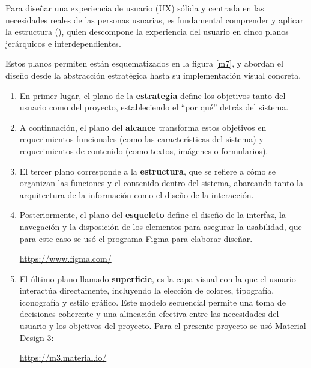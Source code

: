 Para diseñar una experiencia de usuario (UX) sólida y centrada en las necesidades reales de las personas usuarias, es fundamental comprender y aplicar la estructura (\cite{garrett2011elements}), quien descompone la experiencia del usuario en cinco planos jerárquicos e interdependientes. 

Estos planos permiten están esquematizados en la figura \ref{m7}, y abordan el diseño desde la abstracción estratégica hasta su implementación visual concreta. 

\begin{enumerate}
  \item En primer lugar, el plano de la \textbf{estrategia} define los objetivos tanto del usuario como del proyecto, estableciendo el ``por qué'' detrás del sistema. 
  
   \item A continuación, el plano del \textbf{alcance} transforma estos objetivos en requerimientos funcionales (como las características del sistema) y requerimientos de contenido (como textos, imágenes o formularios).

 \item El tercer plano corresponde a la \textbf{estructura}, que se refiere a cómo se organizan las funciones y el contenido dentro del sistema, abarcando tanto la arquitectura de la información como el diseño de la interacción. 
 
  \item Posteriormente, el plano del \textbf{esqueleto} define el diseño de la interfaz, la navegación y la disposición de los elementos para asegurar la usabilidad, que para este caso se usó el programa Figma para elaborar diseñar. 
  \begin{center}
    \url{https://www.figma.com/}
  \end{center}
  
   \item El último plano llamado \textbf{superficie}, es la capa visual con la que el usuario interactúa directamente, incluyendo la elección de colores, tipografía, iconografía y estilo gráfico. Este modelo secuencial permite una toma de decisiones coherente y una alineación efectiva entre las necesidades del usuario y los objetivos del proyecto. Para el presente proyecto se usó Material Design 3:
   \begin{center}
    \url{https://m3.material.io/}
   \end{center}
\end{enumerate}


